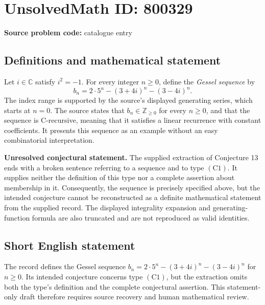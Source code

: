 \documentclass[11pt]{article}
\newcommand{\Z}{\mathbb{Z}}
\newcommand{\C}{\mathbb{C}}
\begin{document}
\section*{UnsolvedMath ID: 800329}
\textbf{Source problem code:} catalogue entry
\subsection{Definitions and mathematical statement}
Let \(i\in\C\) satisfy \(i^2=-1\). For every integer \(n\geq 0\), define the \emph{Gessel sequence} by
\[
b_n=2\cdot 5^n-(3+4i)^n-(3-4i)^n.
\]
The index range is supported by the source's displayed generating series, which starts at \(n=0\). The source states that \(b_n\in\Z_{\geq 0}\) for every \(n\geq 0\), and that the sequence is C-recursive, meaning that it satisfies a linear recurrence with constant coefficients. It presents this sequence as an example without an easy combinatorial interpretation.

\textbf{Unresolved conjectural statement.} The supplied extraction of Conjecture 13 ends with a broken sentence referring to a sequence and to type \(\mathrm{(C1)}\). It supplies neither the definition of this type nor a complete assertion about membership in it. Consequently, the sequence is precisely specified above, but the intended conjecture cannot be reconstructed as a definite mathematical statement from the supplied record. The displayed integrality expansion and generating-function formula are also truncated and are not reproduced as valid identities.
\subsection{Short English statement}
The record defines the Gessel sequence \(b_n=2\cdot5^n-(3+4i)^n-(3-4i)^n\) for \(n\geq0\). Its intended conjecture concerns type \(\mathrm{(C1)}\), but the extraction omits both the type's definition and the complete conjectural assertion. This statement-only draft therefore requires source recovery and human mathematical review.
\end{document}
